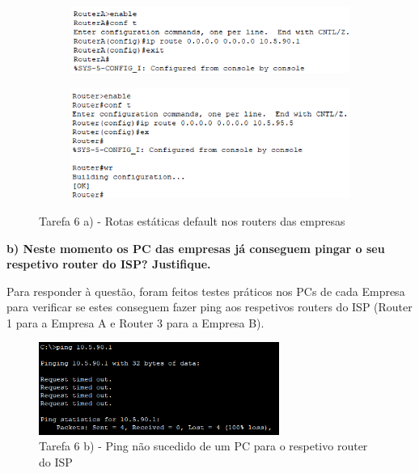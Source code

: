 \documentclass[11pt,english, openright, oneside]{book}
\begin{document}
\begin{figure}[h]
    \centering
    \begin{subfigure}{.5\textwidth}
        \centering
        \includegraphics[width=0.99\linewidth]{imagens/Tarefa6/6.a_RouterA.png}
    \end{subfigure}%
    \begin{subfigure}{.5\textwidth}
        \centering
        \includegraphics[width=0.99\linewidth]{imagens/Tarefa6/6.a_RouterB.png}
    \end{subfigure}
    \caption{Tarefa 6 a) - Rotas estáticas default nos routers das empresas}
    \label{fig:6.a}
\end{figure}
\vspace{0.8cm}


\vspace{0.8cm}

\pagebreak
\textbf{b) Neste momento os PC das empresas já conseguem pingar o seu respetivo router do ISP? Justifique.}
\vspace{0.2cm}

Para responder à questão, foram feitos testes práticos nos PCs de cada Empresa para verificar se estes conseguem fazer ping aos respetivos routers do ISP (Router 1 para a Empresa A e Router 3 para a Empresa B). \par \vspace{0.4cm}

\begin{figure}[H]
    \centering
    \includegraphics[width=0.7\textwidth]{imagens/Tarefa6/6.b_PC_Ping.png}
    \caption{Tarefa 6 b) - Ping não sucedido de um PC para o respetivo router do ISP}
    \label{fig:6.b_ping}
\end{figure}
\vspace{0.4cm}
\end{document}
